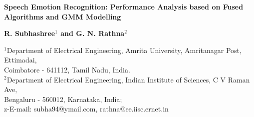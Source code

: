 \documentclass[10pt,a4paper,twoside]{article}
\begin{document}
{\Huge \color{tieude}
\begin{flushright}
\fontsize{17,28pt}{23pt}\selectfont \LARGE{\textbf{Speech Emotion Recognition: Performance Analysis based on Fused Algorithms and GMM Modelling}}
\end{flushright}}
\begin{flushright}
\textbf{{R. Subhashree}$^1$ and {G. N. Rathna}$^2$}
\end{flushright}
\begin{flushright}
{{$^1${Department of Electrical Engineering, Amrita University, Amritanagar Post, Ettimadai,}\\
Coimbatore - 641112, Tamil Nadu, India.\\
$^2$Department of Electrical Engineering, Indian Institute of Sciences, C V Raman Ave,\\
Bengaluru - 560012, Karnataka, India;\\
z-E-mail: subha94@ymail.com, rathna@ee.iisc.ernet.in}}
\end{flushright}
\vspace{-0,4cm}
\setlength{\FrameRule}{2pt}
\setlength{\FrameSep}{5pt}
\end{document}
